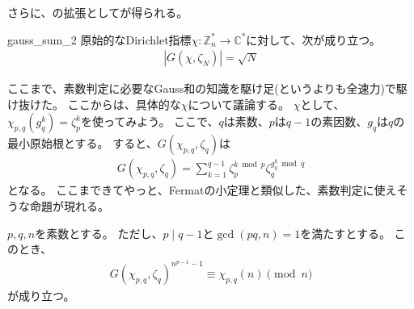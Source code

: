 さらに、の拡張としてが得られる。

\begin{Prop}{}{gauss_sum_2}
原始的なDirichlet指標$\chi:\mathbb{Z}_n^*\to\mathbb{C}^*$に対して、次が成り立つ。
\begin{align*}
|G(\chi, \zeta_N)| = \sqrt{N}
\end{align*}
\end{Prop}

ここまで、素数判定に必要なGauss和の知識を駆け足(というよりも全速力)で駆け抜けた。
ここからは、具体的な$\chi$について議論する。
$\chi$として、$\chi_{p,q}(g_q^k)=\zeta_p^k$を使ってみよう。
ここで、$q$は素数、$p$は$q-1$の素因数、$g_q$は$q$の最小原始根とする。
すると、$G(\chi_{p,q}, \zeta_q)$は
\begin{align*}
G(\chi_{p,q}, \zeta_q) = \sum_{k=1}^{q-1} \zeta_p^{k \bmod{p}}\zeta_q^{g_q^k \bmod{q}}
\end{align*}
となる。
ここまできてやっと、Fermatの小定理と類似した、素数判定に使えそうな命題が現れる。

\begin{Prop}{}{}
$p,q,n$を素数とする。
ただし、$p \mid q-1$と$\gcd(pq, n)=1$を満たすとする。
このとき、
\begin{align*}
G(\chi_{p,q}, \zeta_q)^{n^{p-1}-1} \equiv \chi_{p,q}(n) \pmod{n}
\end{align*}
が成り立つ。
\end{Prop}

